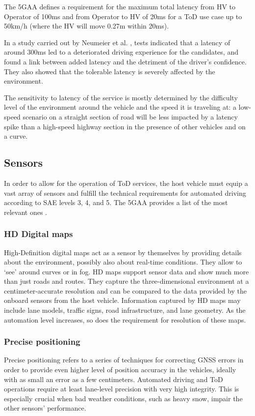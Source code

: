 The 5GAA \cite{5gaa_tod_system_requirements_architecture} defines a requirement for the maximum total latency from HV to Operator of 100ms and from Operator to HV of 20ms for a ToD use case up to 50km/h (where the HV will move 0.27m within 20ms).

In a study carried out by Neumeier et al. \cite{teleoperation_latency_matters}, tests indicated that a latency of around 300ms led to a deteriorated driving experience for the candidates, and found a link between added latency and the detriment of the driver's confidence. They also showed that the tolerable latency is severely affected by the environment.

The sensitivity to latency of the service is mostly determined by the difficulty level of the environment around the vehicle and the speed it is traveling at: a low-speed scenario on a straight section of road will be less impacted by a latency spike than a high-speed highway section in the presence of other vehicles and on a curve.


\subsection{Sensors}
In order to allow for the operation of ToD services, the host vehicle must equip a vast array of sensors and fulfill the technical requirements for automated driving according to SAE levels 3, 4, and 5. The 5GAA provides a list of the most relevant ones \cite{5gaa_tod_system_requirements_architecture}.

\subsubsection{HD Digital maps}
High-Definition digital maps act as a sensor by themselves by providing details about the environment, possibly also about real-time conditions. They allow to `see' around curves or in fog.
HD maps support sensor data and show much more than just roads and routes. They capture the three-dimensional environment at a centimeter-accurate resolution and can be compared to the data provided by the onboard sensors from the host vehicle.
Information captured by HD maps may include lane models, traffic signs, road infrastructure, and lane geometry. As the automation level increases, so does the requirement for resolution of these maps.

\subsubsection{Precise positioning}
Precise positioning refers to a series of techniques for correcting GNSS errors in order to provide even higher level of position accuracy in the vehicles, ideally with as small an error as a few centimeters.
Automated driving and ToD operations require at least lane-level precision with very high integrity. This is especially crucial when bad weather conditions, such as heavy snow, impair the other sensors' performance.

